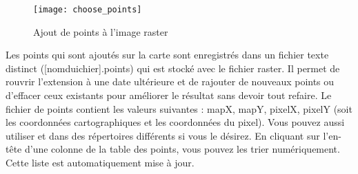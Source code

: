 \begin{figure}[ht]
\centering
  \texttt{[image: choose\_points]}
  \caption{Ajout de points à l'image raster \nixcaption}\label{fig:choose_points}
\end{figure}


Les points qui sont ajoutés sur la carte sont enregistrés dans un fichier texte distinct ([nomduichier].points) qui est stocké avec le fichier raster. Il permet de rouvrir l'extension à une date ultérieure et de rajouter de nouveaux points ou d'effacer ceux existants pour améliorer le résultat sans devoir tout refaire. Le fichier de points contient les valeurs suivantes : mapX, mapY, pixelX, pixelY (soit les coordonnées cartographiques et les coordonnées du pixel). Vous pouvez aussi utiliser  et  dans des répertoires différents si vous le désirez. En cliquant sur l'en-tête d'une colonne de la table des points, vous pouvez les trier numériquement. Cette liste est automatiquement mise à jour. %

\label{georeferencer_transformation}


